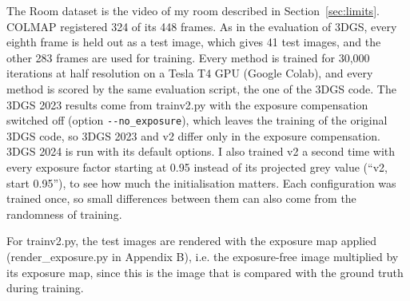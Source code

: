 \documentclass[11pt,a4paper]{article}
\begin{document}
The Room dataset is the video of my room described in Section~\ref{sec:limits}. COLMAP registered 324 of its 448 frames. As in the evaluation of 3DGS, every eighth frame is held out as a test image, which gives 41 test images, and the other 283 frames are used for training. Every method is trained for 30,000 iterations at half resolution on a Tesla T4 GPU (Google Colab), and every method is scored by the same evaluation script, the one of the 3DGS code. The 3DGS 2023 results come from trainv2.py with the exposure compensation switched off (option \texttt{-{}-no\_exposure}), which leaves the training of the original 3DGS code, so 3DGS 2023 and v2 differ only in the exposure compensation. 3DGS 2024 is run with its default options. I also trained v2 a second time with every exposure factor starting at 0.95 instead of its projected grey value (``v2, start 0.95''), to see how much the initialisation matters. Each configuration was trained once, so small differences between them can also come from the randomness of training.

For trainv2.py, the test images are rendered with the exposure map applied (render\_exposure.py in Appendix B), i.e. the exposure-free image multiplied by its exposure map, since this is the image that is compared with the ground truth during training.
\end{document}
